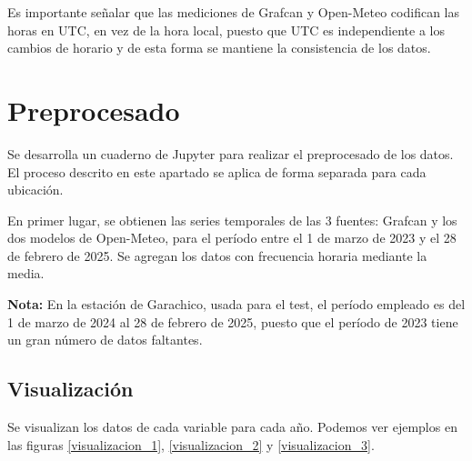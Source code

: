 Es importante señalar que las mediciones de Grafcan y Open-Meteo codifican las horas en UTC, en vez de la hora local, puesto que UTC es independiente a los cambios de horario
y de esta forma se mantiene la consistencia de los datos.

\section{Preprocesado}

Se desarrolla un cuaderno de Jupyter para realizar el preprocesado de los datos. El proceso descrito en este apartado
se aplica de forma separada para cada ubicación.

En primer lugar, se obtienen las series temporales de las 3 fuentes: Grafcan y los dos modelos de Open-Meteo, para el período entre el 1 de marzo de 2023 y el 28 de febrero de 2025.
Se agregan los datos con frecuencia horaria mediante la media. 

\textbf{Nota:} En la estación de Garachico, usada para el test, el período empleado es del 1 de marzo de 2024 al 28 de febrero de 2025, puesto que el período de 2023 tiene 
un gran número de datos faltantes.

\subsection{Visualización}
Se visualizan los datos de cada variable para cada año. Podemos ver ejemplos en las figuras \ref{visualizacion_1}, \ref{visualizacion_2} y \ref{visualizacion_3}.

